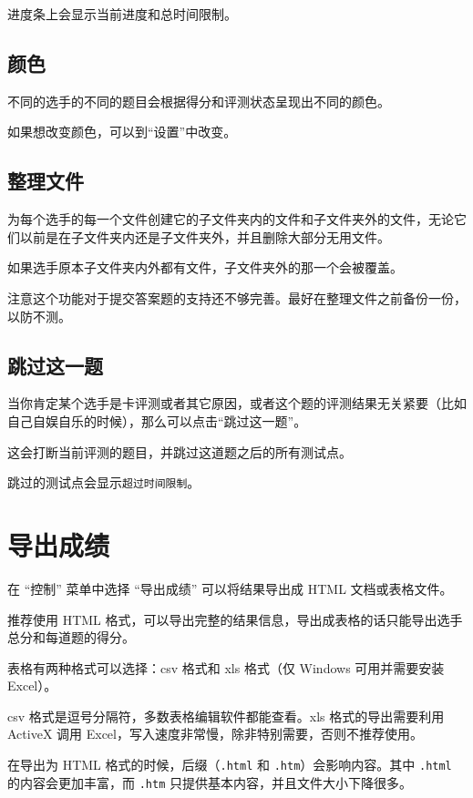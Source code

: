 \documentclass[UTF-8]{ctexart}
\begin{document}
			进度条上会显示当前进度和总时间限制。
		
		\subsection{颜色}
		
			不同的选手的不同的题目会根据得分和评测状态呈现出不同的颜色。
			
			如果想改变颜色，可以到“设置”中改变。
		
		\subsection{整理文件}
		
			为每个选手的每一个文件创建它的子文件夹内的文件和子文件夹外的文件，无论它们以前是在子文件夹内还是子文件夹外，并且删除大部分无用文件。
			
			如果选手原本子文件夹内外都有文件，子文件夹外的那一个会被覆盖。
			
			注意这个功能对于提交答案题的支持还不够完善。最好在整理文件之前备份一份，以防不测。
		
		\subsection{跳过这一题}
		
			当你肯定某个选手是卡评测或者其它原因，或者这个题的评测结果无关紧要（比如自己自娱自乐的时候），那么可以点击“跳过这一题”。
			
			这会打断当前评测的题目，并跳过这道题之后的所有测试点。
			
			跳过的测试点会显示\texttt{超过时间限制}。
			
	\newpage
		
	\section{导出成绩}
	
		在 “控制” 菜单中选择 “导出成绩” 可以将结果导出成 HTML 文档或表格文件。
		
		推荐使用 HTML 格式，可以导出完整的结果信息，导出成表格的话只能导出选手总分和每道题的得分。
		
		表格有两种格式可以选择：csv 格式和 xls 格式（仅 Windows 可用并需要安装 Excel）。
		
		csv 格式是逗号分隔符，多数表格编辑软件都能查看。xls 格式的导出需要利用 ActiveX 调用 Excel，写入速度非常慢，除非特别需要，否则不推荐使用。
		
		在导出为 HTML 格式的时候，后缀（\texttt{.html} 和 \texttt{.htm}）会影响内容。其中 \texttt{.html} 的内容会更加丰富，而 \texttt{.htm} 只提供基本内容，并且文件大小下降很多。
		
\end{document}
